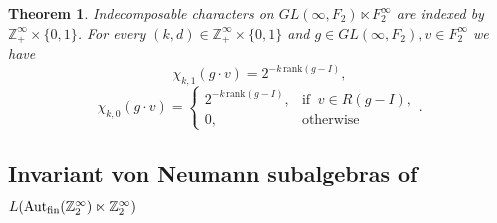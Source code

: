 \documentclass[11pt]{amsart}
\newcommand{\Z}{\mathbb Z}
\newcommand{\aut}{{\rm Aut}}
\newcommand{\fin}{{\rm fin}}
\theoremstyle{plain}
\newtheorem{theorem}{Theorem}[section]
\theoremstyle{definition}
\theoremstyle{remark}
\numberwithin{equation}{section}
\begin{document}
\begin{theorem}\label{theorem: characters Gl times F2infty}
Indecomposable characters on $GL(\infty,F_2)\ltimes  F_2^\infty$ are indexed by $\Z_+^\infty \times \{0,1\}$. For every $(k,d) \in \Z_+^\infty \times \{0,1\}$ and $g\in GL(\infty,F_2),v\in  F_2^\infty$ we have  
\begin{equation}\chi_{k,1}(g\cdot v)=2^{-k\,\mathrm{rank}(g-I)},\end{equation}
	\begin{equation}
		\chi_{k,0}(g\cdot v)=\left\{\begin{array}{ll}2^{-k\,\mathrm{rank}(g-I)},&\text{if}\;\;v\in R(g-I),\\
			0,&\text{otherwise}
		\end{array}.\right.
	\end{equation}
\end{theorem}


\subsection*{Invariant von Neumann subalgebras of $L(\aut_\fin (\Z_2^\infty)\ltimes \Z_2^\infty)$}
\end{document}
